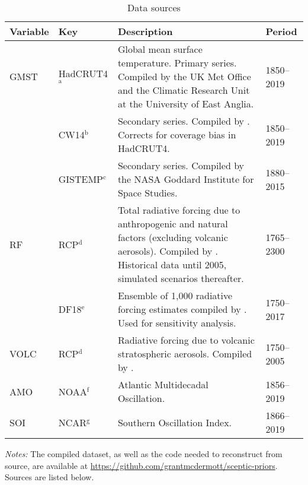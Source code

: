 \documentclass[smallextended]{svjour3}       %
\begin{document}
\begin{table}[t]
    \caption{Data sources}
    \label{tab:sources}
    \small
    \centering
    \begin{threeparttable}
        \begin{tabularx}{\linewidth}{ l l X l}
            \toprule
            Variable    & Key & Description & Period \\
            \midrule
            GMST    &   HadCRUT4$^\text{a}$ &   Global mean surface temperature. Primary series. Compiled by the UK Met Office and the Climatic Research Unit at the University of East Anglia. & 1850--2019 \\
                        &   CW14$^\text{b}$     &   Secondary series. Compiled by \cite{cowtan2014coverage}. Corrects for coverage bias in HadCRUT4.    & 1850--2019 \\
                        & GISTEMP$^\text{c}$        & Secondary series. Compiled by the NASA Goddard Institute for Space Studies.                                           &   1880--2015 \\
            \midrule
            RF      & RCP$^\text{d}$                & Total radiative forcing due to anthropogenic and natural factors (excluding volcanic aerosols). Compiled by \cite{meinshausen2011rcp}. Historical data until 2005, simulated scenarios thereafter.                & 1765--2300 \\
                    & DF18$^\text{e}$               & Ensemble of 1,000 radiative forcing estimates compiled by \cite{dessler2018ecs}. Used for sensitivity analysis.               & 1750--2017 \\
            \midrule
            VOLC        & RCP$^\text{d}$                & Radiative forcing due to volcanic stratospheric aerosols. Compiled by \cite{meinshausen2011rcp}.                                                                                          & 1750--2005 \\
            \midrule
            AMO     & NOAA$^\text{f}$               & Atlantic Multidecadal Oscillation.                                            &   1856--2019 \\
            SOI     & NCAR$^\text{g}$               & Southern Oscillation Index.                                                           &   1866--2019 \\
            \bottomrule
        \end{tabularx}
    \begin{tablenotes}
        \footnotesize
            \item \textit{Notes:} The compiled dataset, as well as the code needed to reconstruct from source, are available at \url{https://github.com/grantmcdermott/sceptic-priors}. Sources are listed below.

\end{tablenotes}
\end{threeparttable}
\end{table}
\end{document}
